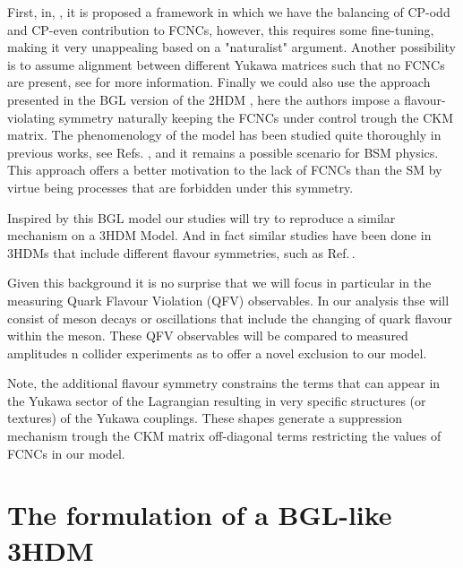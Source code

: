First, in, \cite{Ferreira_2011,Nebot_2015,ferreira2019strong}, it is proposed a framework in which we have the balancing of CP-odd and CP-even contribution to FCNCs, however, this requires some fine-tuning, making it very unappealing based on a "naturalist" argument. 
% 
Another possibility is to assume alignment between different Yukawa matrices such that no FCNCs are present, see \cite{Pich_2009,Jung_2010,Jung_2011} for more information. 
%
Finally we could also use the approach presented in the BGL version of the 2HDM \cite{Branco_1996,LAVOURA1994}, here the authors impose a flavour-violating symmetry naturally keeping the FCNCs under control trough the CKM matrix. 
%
The phenomenology of the model has been studied quite thoroughly in previous works, see Refs. \cite{Botella_2014,Botella_2016}, and it remains a possible scenario for BSM physics.
%
This approach offers a better motivation to the lack of FCNCs than the SM by virtue being processes that are forbidden under this symmetry. 

Inspired by this BGL model our studies will try to reproduce a similar mechanism on a 3HDM Model. 
%
And in fact similar studies have been done in 3HDMs that include different flavour symmetries, such as Ref.\,\cite{Camargo_Molina_2018}.

Given this background it is no surprise that we will focus in particular in the measuring Quark Flavour Violation (QFV) observables. 
%
In our analysis thse will consist of meson decays or oscillations that include the changing of quark flavour within the meson. 
%
These QFV observables will be compared to measured amplitudes n collider experiments as to offer a novel exclusion to our model. 

Note, the additional flavour symmetry constrains the terms that can appear in the Yukawa sector of the Lagrangian resulting in very specific structures (or textures) of the Yukawa couplings.
%
These shapes generate a suppression mechanism trough the CKM matrix off-diagonal terms restricting the values of FCNCs in our model.
 
\section{The formulation of a BGL-like 3HDM} 

